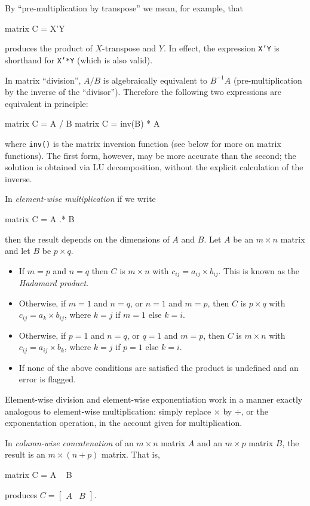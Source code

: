 By ``pre-multiplication by transpose'' we mean, for example, that 
%
\begin{code}
matrix C = X'Y
\end{code}
%
produces the product of $X$-transpose and $Y$.  In effect, 
the expression \texttt{X'Y} is shorthand for \texttt{X'*Y}
(which is also valid).

In matrix ``division'', $A/B$ is algebraically equivalent to
$B^{-1}A$ (pre-multiplication by the inverse of the ``divisor'').
Therefore the following two expressions are equivalent in principle:
%
\begin{code}
matrix C = A / B
matrix C = inv(B) * A
\end{code}
%
where \texttt{inv()} is the matrix inversion function (see below for
more on matrix functions).  The first form, however, may be more
accurate than the second; the solution is obtained via LU
decomposition, without the explicit calculation of the inverse.

In \textit{element-wise multiplication} if we write
%
\begin{code}
matrix C = A .* B
\end{code}
% 
then the result depends on the dimensions of $A$ and $B$.  Let $A$ be
an $m \times n$ matrix and let $B$ be $p \times q$.  
%
\begin{itemize}
\item If $m=p$ and $n=q$ then $C$ is $m\times n$ with $c_{ij} = a_{ij}
  \times b_{ij}$.  This is known as the \emph{Hadamard product}.
\item Otherwise, if $m=1$ and $n=q$, or $n=1$ and $m=p$, then $C$ is
  $p\times q$ with $c_{ij} = a_k \times b_{ij}$, where $k=j$ if $m=1$
  else $k=i$.
\item Otherwise, if $p=1$ and $n=q$, or $q=1$ and $m=p$, then $C$ is
  $m\times n$ with $c_{ij} = a_{ij} \times b_k$, where $k=j$ if $p=1$
  else $k=i$.
\item If none of the above conditions are satisfied the product is
  undefined and an error is flagged.
\end{itemize}

Element-wise division and element-wise exponentiation work in a manner
exactly analogous to element-wise multiplication: simply replace
$\times$ by $\div$, or the exponentation operation, in the account
given for multiplication.

In \textit{column-wise concatenation} of an $m\times n$ matrix $A$ and
an $m\times p$ matrix $B$, the result is an $m\times (n+p)$ matrix.
That is,
%
\begin{code}
matrix C = A ~ B
\end{code}
% 
produces $C = \left[ \begin{array}{cc} A & B \end{array} \right]$.

